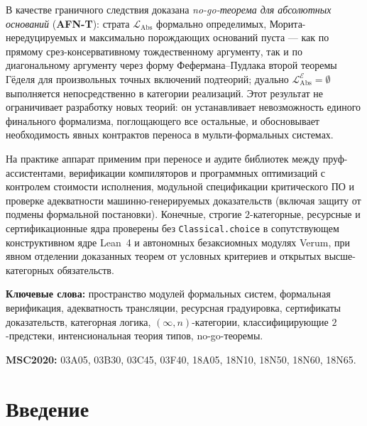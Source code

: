 \documentclass[11pt]{article}
\theoremstyle{plain}
\theoremstyle{definition}
\newcommand{\LAbs}{\mathcal{L}_{\mathrm{Abs}}}
\newcommand{\cE}{\mathcal{E}}
\renewenvironment{abstract}{%
  \small\linespread{0.93}\selectfont
  \begin{center}\bfseries \abstractname\end{center}\vspace{-0.55em}%
  \list{}{\leftmargin=0.30em \rightmargin=0.30em \topsep=0pt \partopsep=0pt \parsep=1.0pt \listparindent=1.2em}%
  \item\relax
}{\endlist}
\begin{document}
\begin{abstract}
В качестве граничного следствия доказана \emph{no-go-теорема для абсолютных оснований} (\textbf{AFN-T}): страта $\LAbs$ формально определимых, Морита-нередуцируемых и максимально порождающих оснований пуста --- как по прямому срез-консервативному тождественному аргументу, так и по диагональному аргументу через форму Фефермана--Пудлака второй теоремы Гёделя для произвольных точных включений подтеорий; дуально $\LAbs^\cE = \emptyset$ выполняется непосредственно в категории реализаций. Этот результат не ограничивает разработку новых теорий: он устанавливает невозможность единого финального формализма, поглощающего все остальные, и обосновывает необходимость явных контрактов переноса в мульти-формальных системах.

На практике аппарат применим при переносе и аудите библиотек между пруф-ассистентами, верификации компиляторов и программных оптимизаций с контролем стоимости исполнения, модульной спецификации критического ПО и проверке адекватности машинно-генерируемых доказательств (включая защиту от подмены формальной постановки). Конечные, строгие $2$-категорные, ресурсные и сертификационные ядра проверены без \texttt{Classical.choice} в сопутствующем конструктивном ядре Lean~4 и автономных безаксиомных модулях Verum, при явном отделении доказанных теорем от условных критериев и открытых высше-категорных обязательств.

\smallskip
\noindent\textbf{Ключевые слова:} пространство модулей формальных систем, формальная верификация, адекватность трансляции, ресурсная градуировка, сертификаты доказательств, категорная логика, $(\infty, n)$-категории, классифицирующие $2$-предстеки, интенсиональная теория типов, no-go-теоремы.

\smallskip
\noindent\textbf{MSC2020:} 03A05, 03B30, 03C45, 03F40, 18A05, 18N10, 18N50, 18N60, 18N65.

\end{abstract}

\newpage
\tableofcontents
\smallskip
\listoffigures
\newpage

\section{Введение}
\end{document}
